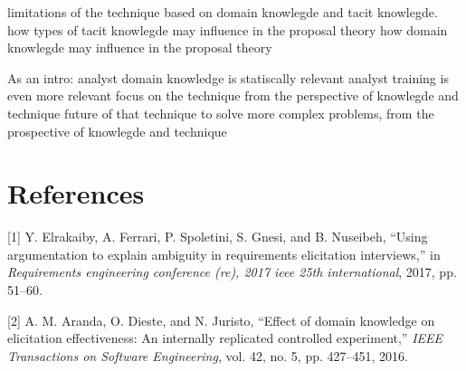 \documentclass[]{llncs}
\begin{document}
limitations of the technique based on domain knowlegde and tacit
knowlegde. how types of tacit knowlegde may influence in the proposal
theory how domain knowlegde may influence in the proposal theory

As an intro: analyst domain knowledge is statiscally relevant analyst
training is even more relevant focus on the technique from the
perspective of knowlegde and technique future of that technique to solve
more complex problems, from the prospective of knowlegde and technique

\newpage

\hypertarget{references}{%
\section*{References}\label{references}}

\hypertarget{refs}{}
\leavevmode\hypertarget{ref-elrakaiby2017using}{}%
{[}1{]} Y. Elrakaiby, A. Ferrari, P. Spoletini, S. Gnesi, and B.
Nuseibeh, ``Using argumentation to explain ambiguity in requirements
elicitation interviews,'' in \emph{Requirements engineering conference
(re), 2017 ieee 25th international}, 2017, pp. 51--60.

\leavevmode\hypertarget{ref-aranda2016effect}{}%
{[}2{]} A. M. Aranda, O. Dieste, and N. Juristo, ``Effect of domain
knowledge on elicitation effectiveness: An internally replicated
controlled experiment,'' \emph{IEEE Transactions on Software
Engineering}, vol. 42, no. 5, pp. 427--451, 2016.
\end{document}
